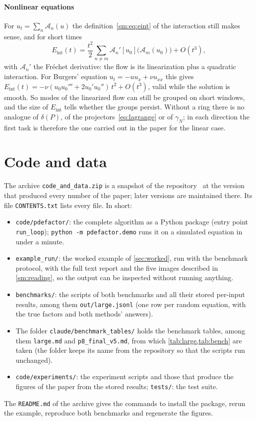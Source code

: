 \documentclass[11pt]{article}
\theoremstyle{plain}
\theoremstyle{definition}
\theoremstyle{remark}
\newcommand{\Eint}{E_{\mathrm{int}}}        %
\newcommand{\gN}{\gamma_{N}}                %
\newcommand{\deltaP}{\delta(P)}             %
\begin{document}
\paragraph{Nonlinear equations} For $u_t=\sum_n\mathcal A_n(u)$ the definition~\eqref{sm:eq:eint} of the interaction still
makes sense, and for short times
\[
  \Eint(t)=\frac{t^2}{2}\sum_{n\neq m}\mathcal A_n'[u_0]\big(\mathcal A_m(u_0)\big)+O(t^3),
\]
with $\mathcal A_n'$ the Fr\'echet derivative: the flow is its linearization plus a quadratic interaction. For Burgers'
equation $u_t=-uu_x+\nu u_{xx}$ this gives $\Eint(t)=-\nu(u_0u_0'''+2u_0'u_0'')\,t^2+O(t^3)$, valid while the solution is
smooth. So modes of the linearized flow can still be grouped on short windows, and the size of $\Eint$ tells whether the
groups persist. Without a ring there is no analogue of $\deltaP$, of the projectors~\eqref{eq:lagrange} or of $\gN$; in
each direction the first task is therefore the one carried out in the paper for the linear case.

\section{Code and data}\label{sm:code}
The archive \texttt{code\_and\_data.zip} is a snapshot of the repository~\cite{Pri26code} at the version that produced
every number of the paper; later versions are maintained there. Its file \texttt{CONTENTS.txt} lists every file. In short:
\begin{itemize}
\item \texttt{code/pdefactor/}: the complete algorithm as a Python package (entry point \texttt{run\_loop});
\texttt{python -m pdefactor.demo} runs it on a simulated equation in under a minute.
\item \texttt{example\_run/}: the worked example of \cref{sec:worked}, run with the benchmark protocol, with the full
text report and the five images described in \cref{sm:reading}, so the output can be inspected without running anything.
\item \texttt{benchmarks/}: the scripts of both benchmarks and all their stored per-input results, among them
\texttt{out/large.jsonl} (one row per random equation, with the true factors and both methods' answers).
\item The folder \texttt{claude/\allowbreak benchmark\_tables/} holds the benchmark tables, among them \texttt{large.md} and
\texttt{p8\_final\_v5.md}, from which \cref{tab:large,tab:bench} are taken (the folder keeps its name from the
repository so that the scripts run unchanged).
\item \texttt{code/experiments/}: the experiment scripts and those that produce the figures of the paper from the
stored results; \texttt{tests/}: the test suite.
\end{itemize}
The \texttt{README.md} of the archive gives the commands to install the package, rerun the example, reproduce both
benchmarks and regenerate the figures.
\end{document}
